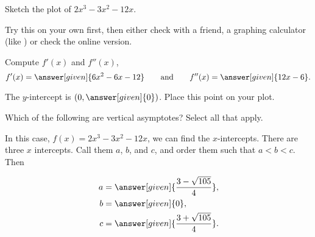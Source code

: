 \documentclass{ximera}
\begin{document}
\begin{example}
Sketch the plot of $2x^3-3x^2-12x$.
\begin{explanation}

 Try this on your own first, then either check with a friend, a graphing calculator (like ) or check the online version.

\begin{hint}
Compute $f'(x)$ and $f''(x)$,
\[
f'(x) = \answer[given]{6x^2 -6x -12}\qquad\text{and}\qquad f''(x) = \answer[given]{12x-6}.
\]
\end{hint}

\begin{hint}
The $y$-intercept is $(0,\answer[given]{0})$. Place this point on your plot.
\begin{image}
\end{image}
\end{hint}

\begin{hint}
Which of the following are vertical asymptotes?  Select all that apply.

\begin{selectAll}
\end{selectAll}
\end{hint}

\begin{hint}
In this case, $f(x) =2x^3-3x^2-12x$, we can find the
$x$-intercepts.   There are three $x$ intercepts.  Call them $a$, $b$, and $c$, and order them such that $a<b<c$.  Then

\begin{align*}
  a &= \answer[given]{\frac{3-\sqrt{105}}{4}},\\
  b &= \answer[given]{0}, \\
  c &= \answer[given]{\frac{3+\sqrt{105}}{4}}.
\end{align*}
\end{hint}


\end{explanation}
\end{example}
\end{document}
